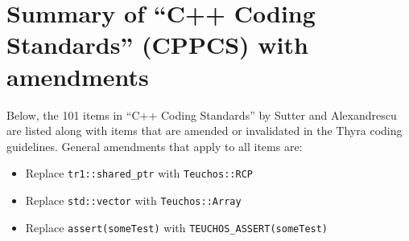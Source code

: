 %
\section{Summary of ``C++ Coding Standards'' (CPPCS) with amendments}
\label{sec:cpp_coding_standards}
%

Below, the 101 items in ``C++ Coding Standards'' by Sutter and Alexandrescu
{}\cite{C++CodingStandards05} are listed along with items that are amended or
invalidated in the Thyra coding guidelines.  General amendments that apply to
all items are:

\begin{itemize}

{}\item Replace {}\texttt{tr1::shared\_ptr} with {}\texttt{Teuchos::RCP}

{}\item Replace {}\texttt{std::vector} with {}\texttt{Teuchos::Array}

{}\item Replace {}\texttt{assert(someTest)} with {}\texttt{TEUCHOS\_ASSERT(someTest)}

\end{itemize}

